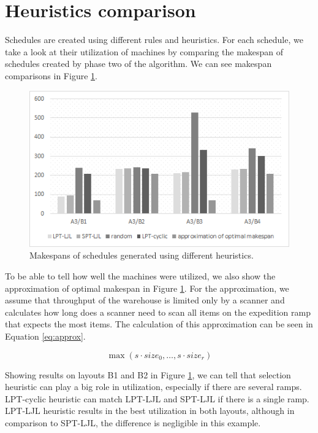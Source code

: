 \documentclass{ctuthesis}
\begin{document}
\section{Heuristics comparison}

Schedules are created using different rules and heuristics. For each schedule, we take a look at their utilization of machines by comparing the makespan of schedules created by phase two of the algorithm. We can see makespan comparisons in Figure \ref{fig:c1}. 

\begin{figure}[H]
\includegraphics[width=\linewidth]{c1.png}
\caption{Makespans of schedules generated using different heuristics.}
\label{fig:c1}
\end{figure}

To be able to tell how well the machines were utilized, we also show the approximation of optimal makespan in Figure \ref{fig:c1}. For the approximation, we assume that throughput of the warehouse is limited only by a scanner and calculates how long does a scanner need to scan all items on the expedition ramp that expects the most items. The calculation of this approximation can be seen in Equation \ref{eq:approx}.

\begin{equation}
\label{eq:approx}
    \max(s \cdot size_0, \ldots, s \cdot size_r)
\end{equation}


Showing results on layouts B1 and B2 in Figure \ref{fig:c1}, we can tell that selection heuristic can play a big role in utilization, especially if there are several ramps. LPT-cyclic heuristic can match LPT-LJL and SPT-LJL if there is a single ramp. LPT-LJL heuristic results in the best utilization in both layouts, although in comparison to SPT-LJL, the difference is negligible in this example.
\end{document}
